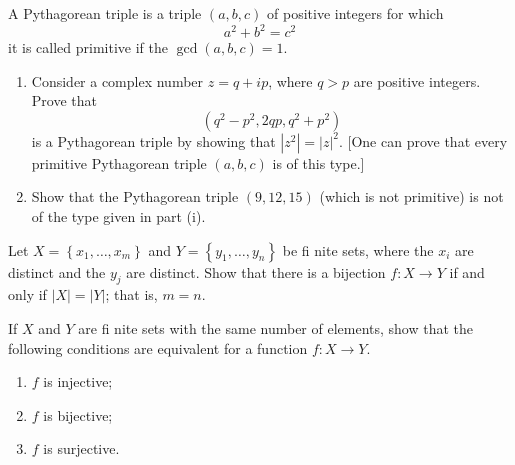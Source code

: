 \begin{questions}
\begin{solution}
    
\end{solution}


\question
     A Pythagorean triple is a triple \((a, b, c)\) of positive integers for which
\[
a^2+b^2=c^2
\]
it is called primitive if the \(\operatorname{gcd}(a, b, c)=1\).
\begin{enumerate}[label=(\alph*)]
    \item Consider a complex number \(z=q+i p\), where \(q>p\) are positive integers. Prove that
\[
\left(q^2-p^2, 2 q p, q^2+p^2\right)
\]
is a Pythagorean triple by showing that \(\left|z^2\right|=|z|^2\). [One can prove that every primitive Pythagorean triple \((a, b, c)\) is of this type.]
\item Show that the Pythagorean triple \((9,12,15)\) (which is not primitive) is not of the type given in part (i).

\end{enumerate}


\begin{solution}
    
\end{solution}


\question
    Let \(X=\left\{x_1, \ldots, x_m\right\}\) and \(Y=\left\{y_1, \ldots, y_n\right\}\) be fi nite sets, where the \(x_i\) are distinct and the \(y_j\) are distinct. Show that there is a bijection \(f: X \rightarrow Y\) if and only if \(|X|=|Y|\); that is, \(m=n\).


\begin{solution}
    
\end{solution}


    If \(X\) and \(Y\) are fi nite sets with the same number of elements, show that the following conditions are equivalent for a function \(f: X \rightarrow Y\).
    \begin{enumerate}[label=(\alph*)]
        \item \(f\) is injective;
        \item \(f\) is bijective;
        \item \(f\) is surjective.
    \end{enumerate}



\begin{solution}
    
\end{solution}



\end{questions}
